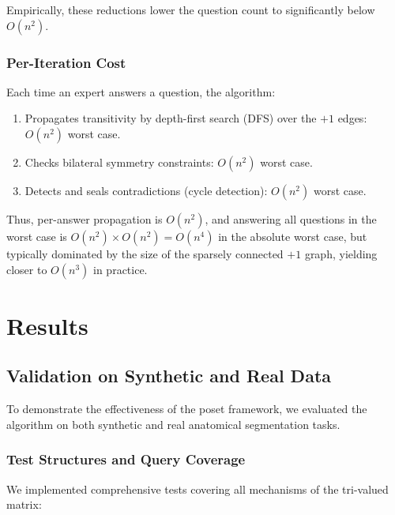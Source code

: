 \documentclass[12pt,a4paper]{article}
\begin{document}
Empirically, these reductions lower the question count to significantly below $O(n^2)$.

\subsubsection{Per-Iteration Cost}

Each time an expert answers a question, the algorithm:
\begin{enumerate}
  \item Propagates transitivity by depth-first search (DFS) over the $+1$ edges: $O(n^2)$ worst case.
  \item Checks bilateral symmetry constraints: $O(n^2)$ worst case.
  \item Detects and seals contradictions (cycle detection): $O(n^2)$ worst case.
\end{enumerate}

Thus, per-answer propagation is $O(n^2)$, and answering all questions in the worst case is $O(n^2) \times O(n^2) = O(n^4)$ in the absolute worst case, but typically dominated by the size of the sparsely connected $+1$ graph, yielding closer to $O(n^3)$ in practice.

\section{Results}

\subsection{Validation on Synthetic and Real Data}

To demonstrate the effectiveness of the poset framework, we evaluated the algorithm on both synthetic and real anatomical segmentation tasks.

\subsubsection{Test Structures and Query Coverage}

We implemented comprehensive tests covering all mechanisms of the tri-valued matrix:
\end{document}
